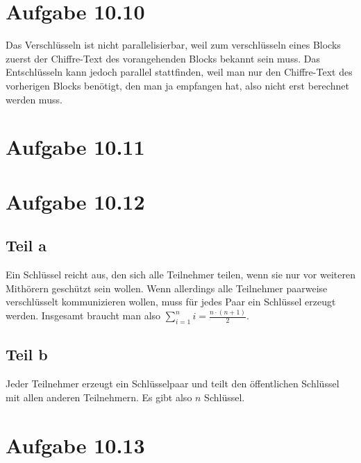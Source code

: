 \documentclass[10pt,a4paper]{article}
\begin{document}
\section{Aufgabe 10.10}

Das Verschlüsseln ist nicht parallelisierbar, weil zum verschlüsseln eines
Blocks zuerst der Chiffre-Text des vorangehenden Blocks bekannt sein muss. Das
Entschlüsseln kann jedoch parallel stattfinden, weil man nur den Chiffre-Text
des vorherigen Blocks benötigt, den man ja empfangen hat, also nicht erst
berechnet werden muss.

\section{Aufgabe 10.11}

\section{Aufgabe 10.12}

\subsection{Teil a}

Ein Schlüssel reicht aus, den sich alle Teilnehmer teilen, wenn sie nur vor
weiteren Mithörern geschützt sein wollen. Wenn allerdings alle Teilnehmer
paarweise verschlüsselt kommunizieren wollen, muss für jedes Paar ein Schlüssel
erzeugt werden. Insgesamt braucht man also
$\sum_{i = 1}^{n} i = \frac{n \cdot (n + 1)}{2}$.

\subsection{Teil b}

Jeder Teilnehmer erzeugt ein Schlüsselpaar und teilt den öffentlichen Schlüssel
mit allen anderen Teilnehmern. Es gibt also $n$ Schlüssel.

\section{Aufgabe 10.13}
\end{document}
